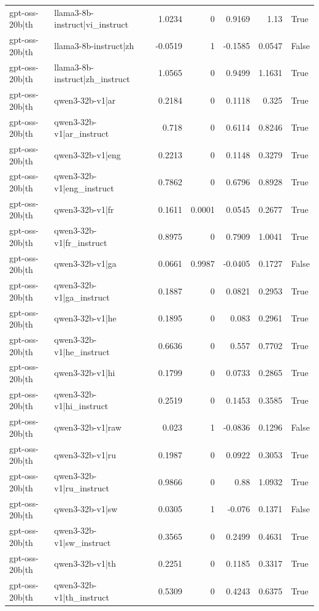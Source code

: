 \begin{table}
\begin{tabular}{l l r r r r l}
gpt-oss-20b|th & llama3-8b-instruct|vi_instruct & 1.0234 & 0 & 0.9169 & 1.13 & True \\
gpt-oss-20b|th & llama3-8b-instruct|zh & -0.0519 & 1 & -0.1585 & 0.0547 & False \\
gpt-oss-20b|th & llama3-8b-instruct|zh_instruct & 1.0565 & 0 & 0.9499 & 1.1631 & True \\
gpt-oss-20b|th & qwen3-32b-v1|ar & 0.2184 & 0 & 0.1118 & 0.325 & True \\
gpt-oss-20b|th & qwen3-32b-v1|ar_instruct & 0.718 & 0 & 0.6114 & 0.8246 & True \\
gpt-oss-20b|th & qwen3-32b-v1|eng & 0.2213 & 0 & 0.1148 & 0.3279 & True \\
gpt-oss-20b|th & qwen3-32b-v1|eng_instruct & 0.7862 & 0 & 0.6796 & 0.8928 & True \\
gpt-oss-20b|th & qwen3-32b-v1|fr & 0.1611 & 0.0001 & 0.0545 & 0.2677 & True \\
gpt-oss-20b|th & qwen3-32b-v1|fr_instruct & 0.8975 & 0 & 0.7909 & 1.0041 & True \\
gpt-oss-20b|th & qwen3-32b-v1|ga & 0.0661 & 0.9987 & -0.0405 & 0.1727 & False \\
gpt-oss-20b|th & qwen3-32b-v1|ga_instruct & 0.1887 & 0 & 0.0821 & 0.2953 & True \\
gpt-oss-20b|th & qwen3-32b-v1|he & 0.1895 & 0 & 0.083 & 0.2961 & True \\
gpt-oss-20b|th & qwen3-32b-v1|he_instruct & 0.6636 & 0 & 0.557 & 0.7702 & True \\
gpt-oss-20b|th & qwen3-32b-v1|hi & 0.1799 & 0 & 0.0733 & 0.2865 & True \\
gpt-oss-20b|th & qwen3-32b-v1|hi_instruct & 0.2519 & 0 & 0.1453 & 0.3585 & True \\
gpt-oss-20b|th & qwen3-32b-v1|raw & 0.023 & 1 & -0.0836 & 0.1296 & False \\
gpt-oss-20b|th & qwen3-32b-v1|ru & 0.1987 & 0 & 0.0922 & 0.3053 & True \\
gpt-oss-20b|th & qwen3-32b-v1|ru_instruct & 0.9866 & 0 & 0.88 & 1.0932 & True \\
gpt-oss-20b|th & qwen3-32b-v1|sw & 0.0305 & 1 & -0.076 & 0.1371 & False \\
gpt-oss-20b|th & qwen3-32b-v1|sw_instruct & 0.3565 & 0 & 0.2499 & 0.4631 & True \\
gpt-oss-20b|th & qwen3-32b-v1|th & 0.2251 & 0 & 0.1185 & 0.3317 & True \\
gpt-oss-20b|th & qwen3-32b-v1|th_instruct & 0.5309 & 0 & 0.4243 & 0.6375 & True \\

\end{tabular}
\end{table}
